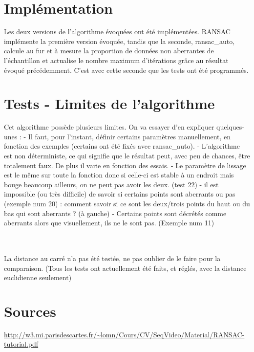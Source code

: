\documentclass[a4paper,12pt]{article} %
\begin{document}
\section{Implémentation}
Les deux versions de l'algorithme évoquées ont été implémentées. RANSAC implémente la première version évoquée, tandis que la seconde, ransac\_auto, calcule au fur et à mesure la proportion de données non aberrantes de l'échantillon et actualise le nombre maximum d'itérations grâce au résultat évoqué précédemment.
C'est avec cette seconde que les tests ont été programmés.

\section{Tests - Limites de l'algorithme}
Cet algorithme possède plusieurs limites. On va essayer d'en expliquer quelques-unes :
- Il faut, pour l'instant, définir certains paramètres manuellement, en fonction des exemples (certains ont été fixés avec ransac\_auto). 
- L'algorithme est non déterministe, ce qui signifie que le résultat peut, avec peu de chances, être totalement faux. De plus il varie en fonction des essais.
- Le paramètre de lissage est le même sur toute la fonction donc si celle-ci est stable à un endroit mais bouge beaucoup ailleurs, on ne peut pas avoir les deux. (test 22)
- il est impossible (ou très difficile) de savoir si certains points sont aberrants ou pas (exemple num 20) : comment savoir si ce sont les deux/trois points du haut ou du bas qui sont aberrants ? (à gauche)
- Certains points sont décrétés comme aberrants alors que visuellement, ils ne le sont pas. (Exemple num 11)

\\
\\
La distance au carré n'a pas été testée, ne pas oublier de le faire pour la comparaison. (Tous les tests ont actuellement été faits, et réglés, avec la distance euclidienne seulement)


\section{Sources}
\url{http://w3.mi.parisdescartes.fr/~lomn/Cours/CV/SeqVideo/Material/RANSAC-tutorial.pdf} \\

\begin{figure}
\begin{center}
\end{center}
\end{figure}
\end{document}
